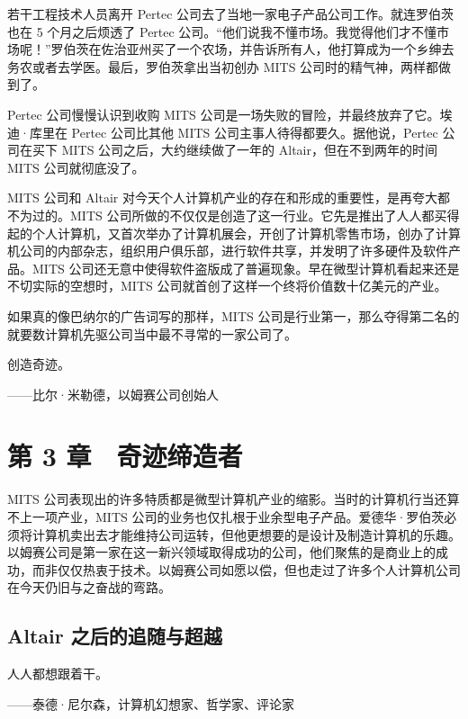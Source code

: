 \documentclass[12pt,UTF8]{ctexbook}
\begin{document}
若干工程技术人员离开 Pertec 公司去了当地一家电子产品公司工作。就连罗伯茨也在 5 个月之后烦透了 Pertec 公司。“他们说我不懂市场。我觉得他们才不懂市场呢！”罗伯茨在佐治亚州买了一个农场，并告诉所有人，他打算成为一个乡绅去务农或者去学医。最后，罗伯茨拿出当初创办 MITS 公司时的精气神，两样都做到了。

Pertec 公司慢慢认识到收购 MITS 公司是一场失败的冒险，并最终放弃了它。埃迪·库里在 Pertec 公司比其他 MITS 公司主事人待得都要久。据他说，Pertec 公司在买下 MITS 公司之后，大约继续做了一年的 Altair，但在不到两年的时间 MITS 公司就彻底没了。

MITS 公司和 Altair 对今天个人计算机产业的存在和形成的重要性，是再夸大都不为过的。MITS 公司所做的不仅仅是创造了这一行业。它先是推出了人人都买得起的个人计算机，又首次举办了计算机展会，开创了计算机零售市场，创办了计算机公司的内部杂志，组织用户俱乐部，进行软件共享，并发明了许多硬件及软件产品。MITS 公司还无意中使得软件盗版成了普遍现象。早在微型计算机看起来还是不切实际的空想时，MITS 公司就首创了这样一个终将价值数十亿美元的产业。

如果真的像巴纳尔的广告词写的那样，MITS 公司是行业第一，那么夺得第二名的就要数计算机先驱公司当中最不寻常的一家公司了。





创造奇迹。

——比尔·米勒德，以姆赛公司创始人





\chapter{第 3 章　奇迹缔造者}


MITS 公司表现出的许多特质都是微型计算机产业的缩影。当时的计算机行当还算不上一项产业，MITS 公司的业务也仅扎根于业余型电子产品。爱德华·罗伯茨必须将计算机卖出去才能维持公司运转，但他更想要的是设计及制造计算机的乐趣。以姆赛公司是第一家在这一新兴领域取得成功的公司，他们聚焦的是商业上的成功，而非仅仅热衷于技术。以姆赛公司如愿以偿，但也走过了许多个人计算机公司在今天仍旧与之奋战的弯路。





\section{Altair 之后的追随与超越}


人人都想跟着干。

——泰德·尼尔森，计算机幻想家、哲学家、评论家
\end{document}
